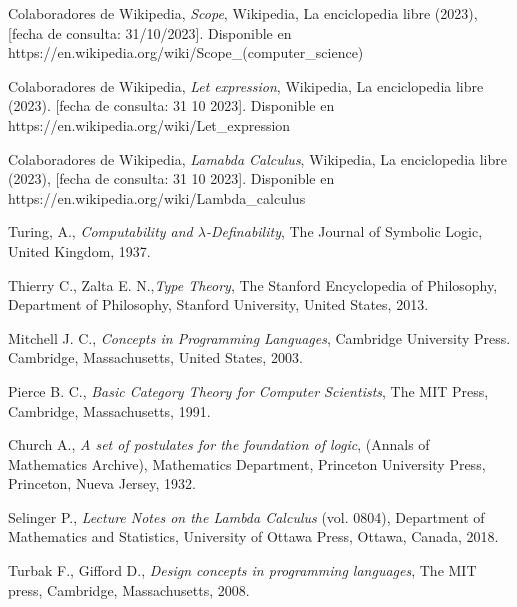 \begin{thebibliography}{11}
    \bibitem{}
    \label{sec:80}
    \hypertarget{80}{}
    Colaboradores de Wikipedia, \textit{Scope}, Wikipedia, La enciclopedia libre (2023), [fecha de consulta: 31/10/2023]. Disponible en https://en.wikipedia.org/wiki/Scope\_(computer\_science)
    
    \bibitem{}
    \label{sec:81}
    \hypertarget{81}{}
    Colaboradores de Wikipedia, \textit{Let expression}, Wikipedia, La enciclopedia libre (2023). [fecha de consulta: 31 10 2023]. Disponible en https://en.wikipedia.org/wiki/Let\_expression

    \bibitem{}
    \label{sec:82}
    \hypertarget{82}{}
    Colaboradores de Wikipedia, \textit{Lamabda Calculus}, Wikipedia, La enciclopedia libre (2023), [fecha de consulta: 31 10 2023]. Disponible en https://en.wikipedia.org/wiki/Lambda\_calculus

    \bibitem{}
    \label{sec:83}
    \hypertarget{83}{}
    Turing, A., \textit{Computability and $\lambda$-Definability}, The Journal of Symbolic Logic, United Kingdom, 1937.%

    \bibitem{}
    \label{sec:84}
    \hypertarget{84}{}
    Thierry C., Zalta E. N.,\textit{Type Theory}, The Stanford Encyclopedia of Philosophy, Department of Philosophy, Stanford University, United States, 2013.
    
    \bibitem{}
    \label{sec:85}
    \hypertarget{85}{}
    Mitchell J. C., \textit{Concepts in Programming Languages}, Cambridge University Press. Cambridge, Massachusetts, United States, 2003. %

    \bibitem{}
    \label{sec:86}
    \hypertarget{86}{}
    Pierce B. C., \textit{Basic Category Theory for Computer Scientists}, The MIT Press, Cambridge, Massachusetts, 1991.  %

    \bibitem{}
    \label{sec:87}
    \hypertarget{87}{}
     Church A., \textit{A set of postulates for the foundation of logic}, (Annals of Mathematics Archive), Mathematics Department, Princeton University Press, Princeton, Nueva Jersey, 1932.%

     \bibitem{}
     \label{sec:88}
     \hypertarget{88}{}
     Selinger P., \textit{Lecture Notes on the Lambda Calculus} (vol. 0804), Department of Mathematics and Statistics, University of Ottawa Press, Ottawa, Canada, 2018.%

     \bibitem{}
     \label{sec:89}
     \hypertarget{89}{}
     Turbak F., Gifford D.,  \textit{Design concepts in programming languages}, The MIT press, Cambridge, Massachusetts, 2008.%


\end{thebibliography}
